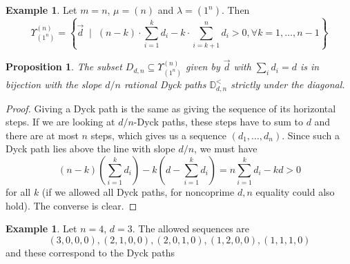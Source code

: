 \documentclass{amsart}
\numberwithin{equation}{section}
\newtheorem{proposition}[lemma]{Proposition}%
\theoremstyle{definition}
\newtheorem{example}[lemma]{Example}%
\newcommand{\Dyck}{\mathbb{D}}
\newcommand{\NEpath}[4]{
    \fill[white!25]  (#1) rectangle +(#2,#3);
    \fill[fill=white]
    (#1)
    \foreach \dir in {#4}{
        \ifnum\dir=0
        -- ++(1,0)
        \else
        -- ++(0,1)
        \fi
    } |- (#1);
    \draw[help lines] (#1) grid +(#2,#3);
    \draw[dashed] (#1) -- +(#2,#3);
    \coordinate (prev) at (#1);
    \foreach \dir in {#4}{
        \ifnum\dir=0
        \coordinate (dep) at (1,0);
        \else
        \coordinate (dep) at (0,1);
        \fi
        \draw[line width=2pt,-stealth] (prev) -- ++(dep) coordinate (prev);
    };
}
\begin{document}
\begin{example}
Let $m=n$, $\mu=(n)$ and $\lambda=(1^n)$. Then 
$$\Upsilon^{(n)}_{(1^n)}=\left\lbrace\vec{d} \;\mid\; (n-k)\cdot \sum_{i=1}^kd_i-k\cdot \sum_{i=k+1}^nd_i>0, \forall k=1,\ldots, n-1\right\rbrace$$
\end{example}
\begin{proposition}
\label{prop:dyckpaths}
 The subset $D_{d,n}\subseteq \Upsilon^{(n)}_{(1^n)}$ given by $\vec{d}$ with $\sum_i d_i=d$ is in bijection with the slope $d/n$ rational Dyck paths $\Dyck_{d,n}^<$ {\em strictly under the diagonal}.
\end{proposition}
\begin{proof}
Giving a Dyck path is the same as giving the sequence of its horizontal steps. If we are looking at $d/n$-Dyck paths, these steps have to sum to $d$ and there are at most $n$ steps, which gives us a sequence $(d_1,\ldots, d_n)$. Since such a Dyck path lies above the line with slope $d/n$, we must have $$(n-k)(\sum_{i=1}^kd_i)-k(d-\sum_{i=1}^k d_i)=
n\sum_{i=1}^k d_i-kd>0
$$ for all $k$ (if we allowed all Dyck paths, for noncoprime $d,n$ equality could also hold). The converse is clear.
\end{proof}
\begin{example}
\label{ex:dyck}
Let $n=4$, $d=3$. The allowed sequences are
$$ (3,0,0,0), (2,1,0,0), (2,0,1,0), (1,2,0,0),(1,1,1,0)$$
and these correspond to the Dyck paths

\begin{center}
\end{center}
\end{example}
\end{document}
